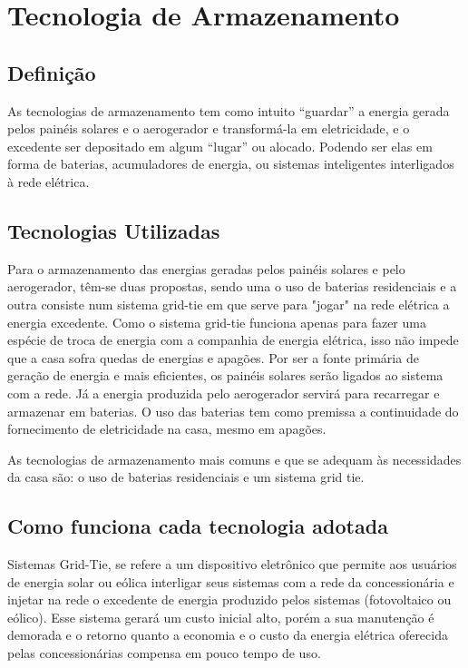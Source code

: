 
\section{Tecnologia de Armazenamento}

\subsection{Definição}

	As tecnologias de armazenamento tem como intuito “guardar” a energia gerada pelos painéis solares e o aerogerador e transformá-la em eletricidade, e o excedente ser depositado em algum “lugar” ou alocado. Podendo ser elas em forma de baterias, acumuladores de energia, ou sistemas inteligentes interligados à rede elétrica.

\subsection{Tecnologias Utilizadas}

	Para o armazenamento das energias geradas pelos painéis solares e pelo aerogerador, têm-se duas propostas, sendo uma o uso de baterias residenciais e a outra consiste num sistema grid-tie em que serve para "jogar" na rede elétrica a energia excedente. Como o sistema grid-tie funciona apenas para fazer uma espécie de troca de energia com a companhia de energia elétrica, isso não impede que a casa sofra quedas de energias e apagões. Por ser a fonte primária de geração de energia e mais eficientes, os painéis solares serão ligados ao sistema com a rede. Já a energia produzida pelo aerogerador servirá para recarregar e armazenar em baterias. O uso das baterias tem como premissa a continuidade do fornecimento de eletricidade na casa, mesmo em apagões.

	As tecnologias de armazenamento mais comuns e que se adequam às necessidades da casa são: o uso de baterias residenciais e um sistema grid tie.

\subsection{Como funciona cada tecnologia adotada}

	Sistemas Grid-Tie, se refere a um dispositivo eletrônico que permite aos usuários de energia solar ou eólica interligar seus sistemas com a rede da concessionária e injetar na rede o excedente de energia produzido pelos sistemas (fotovoltaico ou eólico). Esse sistema gerará um custo inicial alto, porém a sua manutenção é demorada e o retorno quanto a economia e o custo da energia elétrica oferecida pelas concessionárias compensa em pouco tempo de uso.

